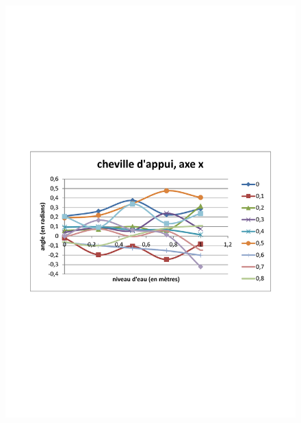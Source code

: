 \documentclass[runningheads,a4paper]{llncs}
\begin{document}
\begin{figure}[h]
\includegraphics[scale=0.3]{traj_pts_clefs/stance_ankle_x.pdf}

\end{figure}
\end{document}
